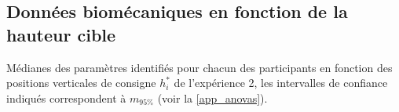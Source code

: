 \begin{appendices}
	
	
	\chapter{Données biomécaniques en fonction de la hauteur cible} \label{app_param_against_target_height}
	
	Médianes des paramètres identifiés pour chacun des participants en fonction des positions verticales de consigne $h_i^*$ de l'expérience 2, les intervalles de confiance indiqués correspondent à $m_{95\%}$ (voir la \cref{app_anovas}).

	\vspace{5mm}


\end{appendices}
